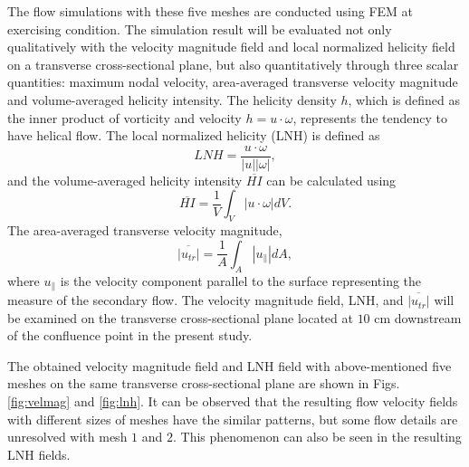 The flow simulations with these five meshes are conducted using FEM at exercising condition. The simulation result will be evaluated not only qualitatively with the velocity magnitude field and local normalized helicity field on a transverse cross-sectional plane, but also quantitatively through three scalar quantities: maximum nodal velocity, area-averaged transverse velocity magnitude and volume-averaged helicity intensity. The helicity density $h$, which is defined as the inner product of vorticity and velocity $h=u\cdot\omega$, represents the tendency to have helical flow. The local normalized helicity (LNH) is defined as
\begin{equation}
LNH=\frac{u\cdot\omega}{\left|u\right|\left|\omega\right|},
\label{eq:LNH}
\end{equation}
and the volume-averaged helicity intensity $\overline{HI}$ can be calculated using
\begin{equation}
\overline{HI}=\frac{1}{V}\int_V \left|u\cdot\omega\right| dV.
\label{eq:HI}
\end{equation}
The area-averaged transverse velocity magnitude,
\begin{equation}
\overline{\left|u_{tr}\right|}=\frac{1}{A}\int_A \left|u _\|\right| dA,
\label{eq:utr}
\end{equation}
where $u _\|$ is the velocity component parallel to the surface representing the measure of the secondary flow. The velocity magnitude field, LNH, and $\overline{\left|u_{tr}\right|}$ will be examined on the transverse cross-sectional plane located at $10$ cm downstream of the confluence point in the present study.  

The obtained velocity magnitude field and LNH field with above-mentioned five meshes on the same transverse cross-sectional plane are shown in Figs. \ref{fig:velmag} and \ref{fig:lnh}. It can be observed that the resulting flow velocity fields with different sizes of meshes have the similar patterns, but some flow details are unresolved with mesh $1$ and $2$. This phenomenon can also be seen in the resulting LNH fields.

